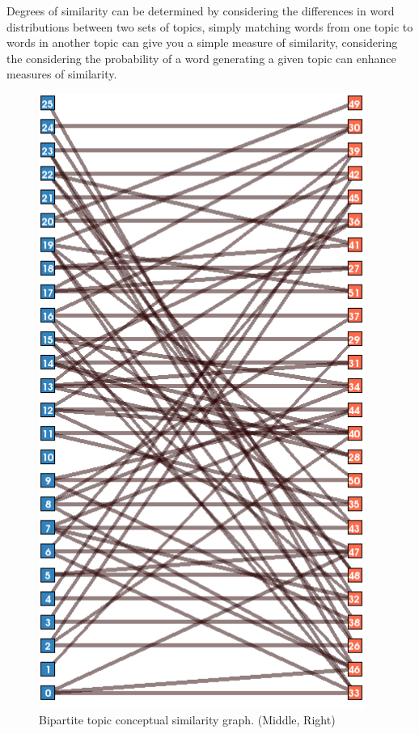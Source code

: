 \documentclass[10pt]{report}
\begin{document}
Degrees of similarity can be determined by considering the differences in word distributions between two sets of topics, simply matching words from one topic to words in another topic can give you a simple measure of similarity, considering the considering the probability of a word generating a given topic can enhance measures of similarity.
\begin{figure}[h!]
  \vspace{0.3cm}
  \centering
    \includegraphics[scale=0.35]{lda_lsa_topic_view}
\caption{Bipartite topic conceptual similarity graph. (Middle, Right)  \label{fig:topic_modelling_comparisons}}
\end{figure}
\end{document}
